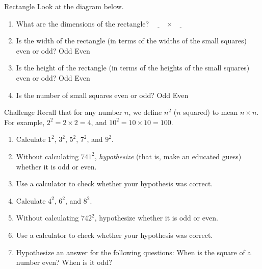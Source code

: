 \documentclass[12pt,letterpaper]{article}
\begin{document}
\begin{problem}{Rectangle}
 Look at the diagram below.

 \begin{center}
 \end{center}

 \begin{enumerate}
  \item What are the dimensions of the rectangle? \hfill
  $\underline{\hspace{2em}}\times\underline{\hspace{2em}}$
  \item Is the width of the rectangle (in terms of the widths of the small
  squares) even or odd? \hfill Odd \hspace{1em} Even
  \item Is the height of the rectangle (in terms of the heights of the small
  squares) even or odd? \hfill Odd \hspace{1em} Even
  \item Is the number of small squares even or odd? \hfill Odd \hspace{1em} Even
 \end{enumerate}
\end{problem}

\begin{problem}{Challenge}
 Recall that for any number $n$, we define $n^2$ ($n$ squared) to mean
 $n\times n$. For example, $2^2=2\times2=4$, and $10^2=10\times10=100$.

 \begin{enumerate}
  \item Calculate $1^2$, $3^2$, $5^2$, $7^2$, and $9^2$.
  \item Without calculating $741^2$, \emph{hypothesize} (that is, make an
  educated guess) whether it is odd or even.
  \item Use a calculator to check whether your hypothesis was correct.
  \item Calculate $4^2$, $6^2$, and $8^2$.
  \item Without calculating $742^2$, hypothesize whether it is odd or even.
  \item Use a calculator to check whether your hypothesis was correct.
  \item Hypothesize an answer for the following questions:
  When is the square of a number even? When is it odd?
 \end{enumerate}
\end{problem}
\end{document}
